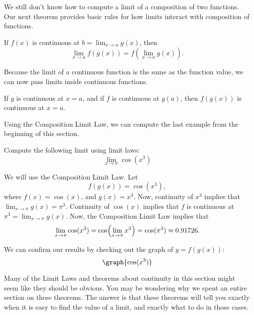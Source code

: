 \documentclass{ximera}
\begin{document}
We still don't know how to compute a limit of a composition of two functions.
Our next theorem provides basic rules for how limits interact with composition
of functions.

\begin{theorem}
  If $f(x)$ is continuous at $b = \lim_{x\to a} g(x)$, then
  \[
  \lim_{x\to a} f(g(x)) = f(\lim_{x\to a} g(x)).
  \]
\end{theorem}

Because the limit of a continuous function is the same as the function
value, we can now pass limits inside continuous functions.

\begin{corollary}

If $g$ is continuous at $x=a$, and if $f $ is continuous at $g(a)$,  then $f(g(x))$ is continuous at $x=a$.



\end{corollary}
Using the Composition Limit Law, we can compute the last example from the beginning of this section.
\begin{example}
  Compute the following limit using limit laws:
  \[
  \lim_{x \to \pi}\cos({x^3})
  \]
  \begin{explanation}
  We will use the Composition Limit Law. 
Let
 \[ 
 f(g(x))=\cos({x^3}),
 \]
 where $f(x)=\cos(x)$, and $g(x)=x^3$.
  Now, continuity of $x^3$ implies that $\lim_{x \to \pi}g(x)=\pi^3$.
    Continuity of $\cos(x)$ implies that $f$ is continuous at $\pi^3=\lim_{x \to \pi}g(x)$.
     Now, the Composition Limit Law implies that
    \[
    \lim_{x \to \pi}\cos({x^3})= \cos\Bigl({\lim_{x \to \pi} x^3}\Bigr)=\cos({\pi^3})\approx 0.91726.
    \]
   
  \begin{onlineOnly}
    We can confirm our results by checking out the graph of $y=f(g(x))$:
    \[
    \graph{\cos({x^3})}
    \]
  \end{onlineOnly}
  \end{explanation}
\end{example}

Many of the Limit Laws and theorems about continuity in this section
might seem like they should be obvious.  You may be wondering why we
spent an entire section on these theorems.  The answer is that these
theorems will tell you exactly when it is easy to find the value of a
limit, and exactly what to do in those cases.
\end{document}
